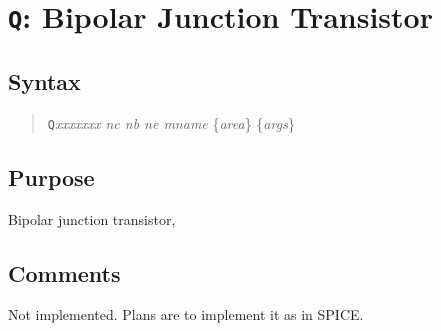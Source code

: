 %
%
%
%
\section{{\tt Q}: Bipolar Junction Transistor}
\subsection{Syntax}
\begin{verse}
{\tt Q}{\it xxxxxxx nc nb ne mname} \{{\it area}\} \{{\it args}\}
\end{verse}
\subsection{Purpose}

Bipolar junction transistor,
\subsection{Comments}

Not implemented.
Plans are to implement it as in SPICE.

